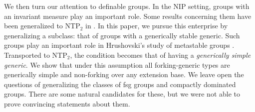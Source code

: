 \documentclass{amsart}
\numberwithin{equation}{section}
\theoremstyle{definition}
\theoremstyle{mystyle}
\theoremstyle{remark}
\begin{document}
We then turn our attention to definable groups. In the NIP setting, groups with an invariant measure play an important role. Some results concerning them have been generalized to NTP$_2$ in \cite{PRC}. In this paper, we pursue this enterprise by generalizing a subclass: that of groups with a generically stable generic. Such groups play an important role in Hrushovski's study of metastable groups \cite{metastableGr}. Transported to NTP$_2$, the condition becomes that of having a \emph{generically simple generic}. We show that under this assumption all forking-generic types are generically simple and non-forking over any extension base. We leave open the questions of generalizing the classes of fsg groups and compactly dominated groups. There are some natural candidates for these, but we were not able to prove convincing statements about them.
%
%
%
\end{document}
